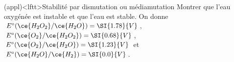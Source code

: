 \documentclass[../../main/main.tex]{subfiles}
\begin{document}
\begin{tcb*}(appl)<lftt>{Stabilité par dismutation ou médiamutation}
  Montrer que l'eau oxygénée  est instable et que l'eau est stable. On
  donne $E^\circ(\ce{H_2O_2}/\ce{H_2O}) = \SI{1.78}{V}$,
  $E^\circ(\ce{O_2}/\ce{H_2O_2}) = \SI{0.68}{V}$, $E^\circ(\ce{O_2}/\ce{H_2O}) =
  \SI{1.23}{V}$ et $E^\circ(\ce{H_2O}/\ce{H_2}) = \SI{0.0}{V}$.
  \tcblower
  \begin{isd}
    \begin{center}
    \end{center}
    \tcblower
    \begin{center}
\end{center}
\end{isd}
\end{tcb*}
\end{document}
